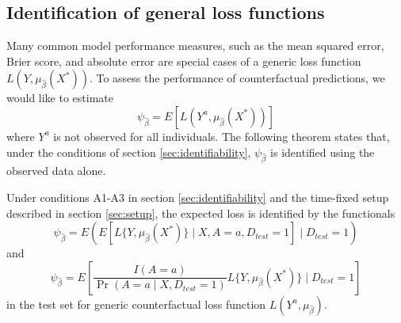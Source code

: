     \subsection{Identification of general loss functions}\label{sec:tf_proof}
    Many common model performance measures, such as the mean squared error, Brier score, and absolute error are special cases of a generic loss function $L(Y, \mu_{\widehat{\beta}}(X^*))$. To assess the performance of counterfactual predictions, we would like to estimate 
    $$\psi_{\widehat{\beta}} = E[L(Y^a, \mu_{\widehat{\beta}}(X^*))]$$
    where $Y^a$ is not observed for all individuals. The following theorem states that, under the conditions of section \ref{sec:identifiability}, $\psi_{\widehat{\beta}}$ is identified using the observed data alone. 
    \begin{theorem}
        Under conditions A1-A3 in section \ref{sec:identifiability} and the time-fixed setup described in section \ref{sec:setup}, the expected loss is identified by the functionals
        \begin{equation}\label{eqn:app_cl_estimand}
            \psi_{\widehat{\beta}} = E\left(E[L\{Y, \mu_{\widehat{\beta}}(X^*)\} \mid X, A=a, D_{test} = 1] \mid D_{test} = 1\right)
        \end{equation}
        and 
        \begin{equation}\label{eqn:app_ipw_estimand}
            \psi_{\widehat{\beta}} = E\left[\frac{I(A = a)}{\Pr(A = a \mid X, D_{test} = 1)}L\{Y, \mu_{\widehat{\beta}}(X^*)\} \mid D_{test} = 1\right]
        \end{equation}
        in the test set for generic counterfactual loss function $L(Y^{a}, \mu_{\widehat{\beta}})$.
    \end{theorem}
    


